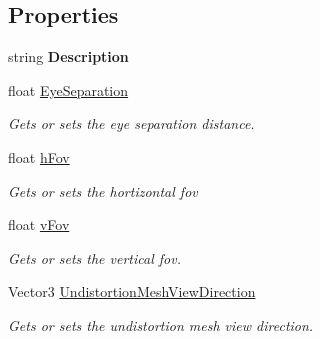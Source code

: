 \subsection*{Properties}
\begin{DoxyCompactItemize}
\item 
\mbox{\label{class_ximmerse_1_1_slide_in_s_d_k_1_1_override_a_r_setting_a8a61031cfe750c773cb07b0cf4ac90b8}} 
string {\bfseries Description}
\item 
float \mbox{\hyperlink{class_ximmerse_1_1_slide_in_s_d_k_1_1_override_a_r_setting_aa4b86d59d748b1be87ed68d20d503fad}{Eye\+Separation}}
\begin{DoxyCompactList}\small\item\em Gets or sets the eye separation distance. \end{DoxyCompactList}\item 
float \mbox{\hyperlink{class_ximmerse_1_1_slide_in_s_d_k_1_1_override_a_r_setting_ac2b080447af41f7c3ffb172a3637a8bc}{h\+Fov}}
\begin{DoxyCompactList}\small\item\em Gets or sets the hortizontal fov \end{DoxyCompactList}\item 
float \mbox{\hyperlink{class_ximmerse_1_1_slide_in_s_d_k_1_1_override_a_r_setting_a74b975635d0934b252363595e9435304}{v\+Fov}}
\begin{DoxyCompactList}\small\item\em Gets or sets the vertical fov. \end{DoxyCompactList}\item 
Vector3 \mbox{\hyperlink{class_ximmerse_1_1_slide_in_s_d_k_1_1_override_a_r_setting_afa2452344716ee1d64c300103b4d249e}{Undistortion\+Mesh\+View\+Direction}}
\begin{DoxyCompactList}\small\item\em Gets or sets the undistortion mesh view direction. \end{DoxyCompactList}\item 

\end{DoxyCompactItemize}
